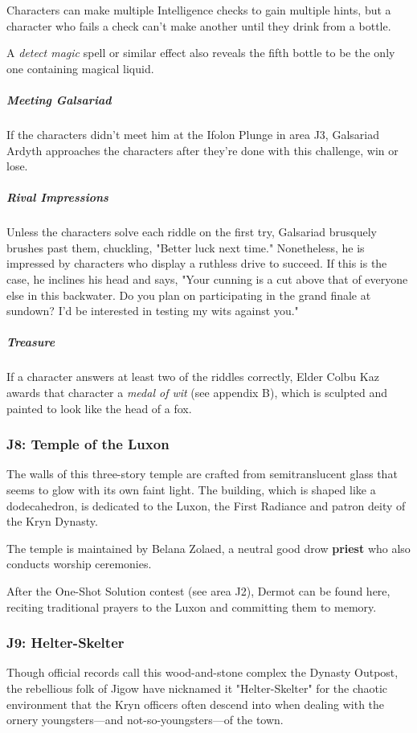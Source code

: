 \documentclass[10pt,a4paper,twoside,fancy,bg=print,twocolumn,openany,nodeprecatedcode]{dndbook}
\begin{document}
Characters can make multiple Intelligence checks to gain multiple hints, but a character who fails a check can't make another until they drink from a bottle.

A \textit{detect magic} spell or similar effect also reveals the fifth bottle to be the only one containing magical liquid.

\subparagraph{Meeting Galsariad}
If the characters didn't meet him at the Ifolon Plunge in area J3, Galsariad Ardyth approaches the characters after they're done with this challenge, win or lose.

\subparagraph{Rival Impressions}
Unless the characters solve each riddle on the first try, Galsariad brusquely brushes past them, chuckling, "Better luck next time." Nonetheless, he is impressed by characters who display a ruthless drive to succeed. If this is the case, he inclines his head and says, "Your cunning is a cut above that of everyone else in this backwater. Do you plan on participating in the grand finale at sundown? I'd be interested in testing my wits against you."

\subparagraph{Treasure}
If a character answers at least two of the riddles correctly, Elder Colbu Kaz awards that character a \textit{medal of wit} (see appendix B), which is sculpted and painted to look like the head of a fox.

\subsubsection{J8: Temple of the Luxon}
\begin{DndReadAloud}{}
The walls of this three-story temple are crafted from semitranslucent glass that seems to glow with its own faint light. The building, which is shaped like a dodecahedron, is dedicated to the Luxon, the First Radiance and patron deity of the Kryn Dynasty.

\end{DndReadAloud}

The temple is maintained by Belana Zolaed, a neutral good drow \textbf{priest} who also conducts worship ceremonies.

After the One-Shot Solution contest (see area J2), Dermot can be found here, reciting traditional prayers to the Luxon and committing them to memory.

\subsubsection{J9: Helter-Skelter}
Though official records call this wood-and-stone complex the Dynasty Outpost, the rebellious folk of Jigow have nicknamed it "Helter-Skelter" for the chaotic environment that the Kryn officers often descend into when dealing with the ornery youngsters—and not-so-youngsters—of the town.
\end{document}
